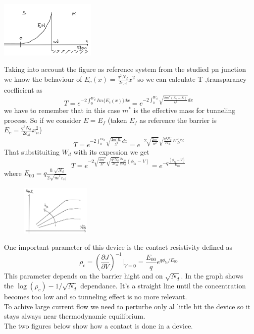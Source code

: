 \centering
\includegraphics[width=0.35\textwidth]{1tunnel.png}\\
\raggedright

Taking into account the figure as reference system from the studied pn junction we know the behaviour of $E_c(x)=\frac{q^2N_d}{2\varepsilon_{Si}}x^2$ so we can calculate T ,transparancy coefficient as 
\begin{equation}
T=e^{-2\int_0^{W_d} Im\{E_c(x)\}dx}=e^{-2\int_0^{W_d} \sqrt{\frac{2m^*(E_c-E)}{\hslash^2}}dx}
\end{equation}
we have to remember that in this case $m^*$ is the effective mass for tunneling process. So if we consider $E=E_f$ (taken $E_f$ as reference the barrier is $E_c=\frac{q^2N_d}{2\varepsilon_{si}}x_n^2$)
\begin{equation}
T=e^{-2\int_0^{W_d} \sqrt{\frac{2m^*E_c}{\hslash^2}}dx}=e^{-2\sqrt{\frac{2m^*}{\hslash^2}}\sqrt{\frac{q^2N_d}{2\varepsilon_{Si}}}W_d^2/2}
\end{equation}
That substituiting $W_d$ with its expession we get
\begin{equation}
T=e^{-2\sqrt{\frac{2m^*}{\hslash^2}}\sqrt{\frac{q^2N_d}{2\varepsilon_{Si}}}\frac{2\varepsilon_{Si}}{qN_d}(\phi_{bi}-V)}=e^{-q \frac{(\phi_{bi}-V)}{E_{00}}}
\end{equation}
where $E_{00}=q\frac{\hslash \sqrt{N_d}}{2\sqrt{m^*\varepsilon_{si}}}$\\

\begin{figure}
\includegraphics[width=0.3\textwidth]{contactrho.png}
\end{figure}

One important parameter of this device is the contact resistivity defined as 
\begin{equation}
\rho_c=(\frac{\partial J }{\partial V})^{-1}|_{V=0}=\frac{E_{00}}{q}e^{q\phi_{bi}/E_{00}}
\end{equation}
This parameter depends on the barrier hight and on $\sqrt{N_d}$. In the graph shows the $\log (\rho_c) - 1/\sqrt{N_d}$ dependance. It's a straight line until the concentration becomes too low and so tunneling effect is no more relevant.\\
To achive large current flow we need to perturbe only al little bit the device so it stays always near thermodynamic equilibrium.\\
The two figures below show how a contact is done in a device.

